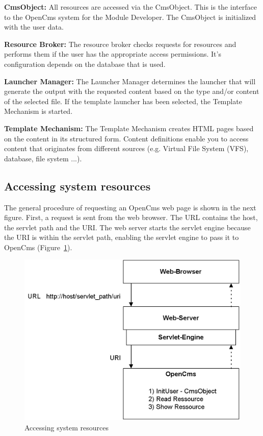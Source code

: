 {\bf CmsObject:}
All resources are accessed via the  CmsObject. This is the interface to
the OpenCms system for the Module Developer. The CmsObject is
initialized with the user data.

{\bf Resource Broker:}
The  resource broker checks requests for resources and performs them if
the user has the appropriate access permissions. It's configuration
depends on the database that is used.

{\bf Launcher Manager:}
The  Launcher Manager determines the launcher that will generate the
output with the requested content based on the type and/or content of
the selected file. If the template launcher has been selected, the
Template Mechanism is started.

{\bf Template Mechanism:}
The  Template Mechanism creates HTML pages based on the content in its
structured form. Content definitions enable you to access content that
originates from different sources (e.g. Virtual File System (VFS),
database, file system ...).


\subsection{Accessing system resources}
The general procedure of requesting an OpenCms web page is shown in the
next figure. First, a request is sent from the web browser. The URL
contains the host, the servlet path and the URI. The web server starts
the  servlet engine because the URI is within the servlet path, enabling
the servlet engine to pass it to OpenCms (Figure~\ref {Accessing1}).

\begin{figure}
\includegraphics[clip,width=\sgw]{pics/modules/3}
\caption[Accessing system resources]{Accessing system resources}
\label{Accessing1}
\end{figure}

